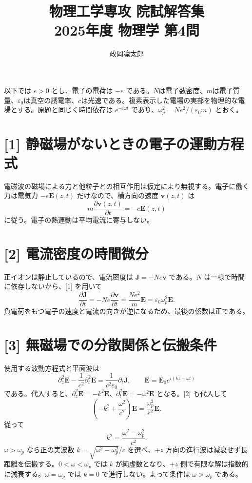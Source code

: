 \documentclass[11pt,a4paper]{article}
\title{物理工学専攻 院試解答集\\2025年度 物理学 第4問}
\author{政岡凜太郎}
\date{}
\begin{document}
\maketitle

以下では $e>0$ とし、電子の電荷は $-e$ である。$N$は電子数密度、$m$は電子質量、$\varepsilon_0$は真空の誘電率、$c$は光速である。複素表示した電場の実部を物理的な電場とする。原題と同じく時間依存は $e^{-i\omega t}$ であり、$\omega_p^2=Ne^2/(\varepsilon_0m)$ とおく。

\section*{[1] 静磁場がないときの電子の運動方程式}
電磁波の磁場による力と他粒子との相互作用は仮定により無視する。電子に働く力は電気力 $-e\boldsymbol E(z,t)$ だけなので、横方向の速度 $\boldsymbol v(z,t)$ は
\[
\boxed{m\frac{\partial\boldsymbol v(z,t)}{\partial t}
=-e\boldsymbol E(z,t)}
\]
に従う。電子の熱運動は平均電流に寄与しない。

\section*{[2] 電流密度の時間微分}
正イオンは静止しているので、電流密度は $\boldsymbol J=-Ne\boldsymbol v$ である。$N$ は一様で時間に依存しないから、[1] を用いて
\[
\boxed{\frac{\partial\boldsymbol J}{\partial t}
=-Ne\frac{\partial\boldsymbol v}{\partial t}
=\frac{Ne^2}{m}\boldsymbol E
=\varepsilon_0\omega_p^2\boldsymbol E.}
\]
負電荷をもつ電子の速度と電流の向きが逆になるため、最後の係数は正である。

\section*{[3] 無磁場での分散関係と伝搬条件}
使用する波動方程式と平面波は
\begin{equation}
 \partial_z^2\boldsymbol E-\frac1{c^2}\partial_t^2\boldsymbol E=\frac1{c^2\varepsilon_0}\partial_t\boldsymbol J,\qquad \boldsymbol E=\boldsymbol E_0e^{i(kz-\omega t)}
\end{equation}
である。代入すると、$\partial_z^2\boldsymbol E=-k^2\boldsymbol E$、$\partial_t^2\boldsymbol E=-\omega^2\boldsymbol E$ となる。[2] も代入して
\[
\left(-k^2+\frac{\omega^2}{c^2}\right)\boldsymbol E
=\frac{\omega_p^2}{c^2}\boldsymbol E.
\]
従って
\[
\boxed{k^2=\frac{\omega^2-\omega_p^2}{c^2}.}
\]
$\omega>\omega_p$ なら正の実波数 $k=\sqrt{\omega^2-\omega_p^2}/c$ を選べ、$+z$ 方向の進行波は減衰せず長距離を伝搬する。$0<\omega<\omega_p$ では $k$ が純虚数となり、$+z$ 側で有限な解は指数的に減衰する。$\omega=\omega_p$ では $k=0$ で進行しない。よって条件は $\boxed{\omega>\omega_p}$ である。
\end{document}

